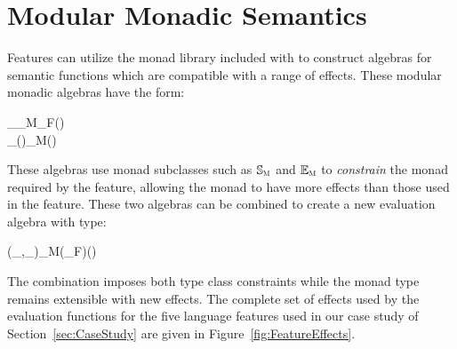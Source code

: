 

\section{Modular Monadic Semantics}



Features can utilize the monad library included with \name to
construct algebras for semantic functions which are compatible with a
range of effects. These modular monadic algebras have the form:
\begin{hscode}\SaveRestoreHook
{}%
%
%
%
\>[3]{}\<[12]%
\>[12]{}\mathbin{::}_{\scalebox{0.6}{M}}\;\;\Rightarrow {}_M\;_F\;(\;){}\<[E]%
\\
\>[3]{}\<[12]%
\>[12]{}\mathbin{::}_{\scalebox{0.6}{M}}\;()\;\Rightarrow {}_M\;\;(\;){}\<[E]%
\ColumnHook
\end{hscode}\resethooks
\noindent These algebras use monad subclasses such as \ensuremath{\mathbb{S}_{\scalebox{0.6}{M}}} and
\ensuremath{\mathbb{E}_{\scalebox{0.6}{M}}} to \emph{constrain} the monad required by the feature,
allowing the monad to have more effects than those used in the feature.
These two algebras can be combined to create a new evaluation algebra
with type:
\begin{hscode}\SaveRestoreHook
{}%
%
%
\>[3]{}(_{\scalebox{0.6}{M}}\;\;,_{\scalebox{0.6}{M}}\;\;)\Rightarrow {}_M\;(_F\oplus{})\;(\;){}\<[E]%
\ColumnHook
\end{hscode}\resethooks
The combination imposes both type class constraints while
the monad type remains extensible with new effects. The complete set of
effects used by the evaluation functions for the five language
features used in our case study of Section~\ref{sec:CaseStudy} are given in Figure~\ref{fig:FeatureEffects}.

